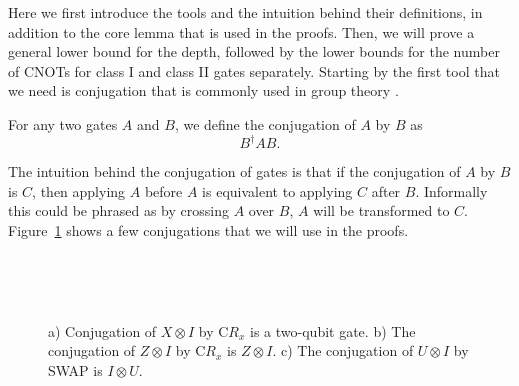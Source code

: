 Here we first introduce the tools and the intuition behind their definitions, in addition to the core lemma that is used in the proofs. Then, we will prove a general lower bound for the depth, followed by the lower bounds for the number of CNOTs for class I and class II gates separately. Starting by the first tool that we need is conjugation that is commonly used in group theory \cite{weisstein}.

\begin{definition}[Conjugation]
  For any two gates $A$ and $B$, we define the conjugation of $A$ by $B$ as
  \begin{equation}
    B^\dagger A B.
  \end{equation}
\end{definition}

The intuition behind the conjugation of gates is that if the conjugation of $A$ by $B$ is $C$, then applying $A$ before $A$ is equivalent to applying $C$ after $B$. Informally this could be phrased as by crossing $A$ over $B$, $A$ will be transformed to $C$. Figure~\ref{fig:conjugations} shows a few conjugations that we will use in the proofs.

\begin{figure}[h!]\label{fig:conjugations}
  \centering
   \\
   \\
  \caption{a) Conjugation of $X \otimes I$ by $\mathrm{C}R_x$ is a two-qubit gate. b) The conjugation of $Z \otimes I$ by $\mathrm{C}R_x$ is $Z \otimes I$. c) The conjugation of $U \otimes I$ by SWAP is $I \otimes U$.}
\end{figure}

